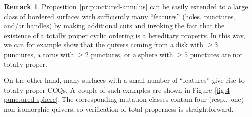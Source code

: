 \documentclass[11pt, letterpaper]{amsart}
\newtheorem{corollary}[theorem]{Corollary}
\theoremstyle{definition}
\newtheorem{remark}[theorem]{Remark}
\numberwithin{equation}{section}
\begin{document}
\begin{remark}
Proposition~\ref{pr:punctured-annulus} can be easily extended to a large class of bordered surfaces with 
sufficiently many ``features'' (holes, punctures, and/or handles) by making additional cuts and
invoking the fact that the existence of a totally proper cyclic ordering is a hereditary property. 
In this way, we can for example show that the quivers coming from 
a disk with $\ge 3$ punctures, a torus with $\ge 2$ punctures,
or a sphere with $\ge 5$ punctures are not totally proper. 

On the other hand, many surfaces with a small number of ``features'' give rise to 
totally proper COQs. 
A~couple of such examples are shown in Figure~\ref{fig:4 punctured sphere}. 
The corresponding mutation classes contain four (resp.,~one) 
non-isomorphic quivers, so verification of total properness is straightforward. 
\end{remark}

\vspace{-5pt}
\end{document}
